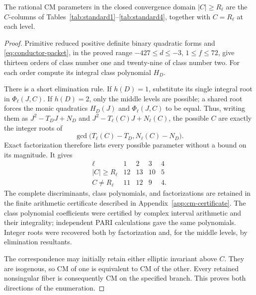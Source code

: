 \begin{lemma}
\label{lem:cm-finite-enumeration}
The rational CM parameters in the closed convergence domain
$|C|\ge R_\ell$ are the $C$-columns of
Tables~\ref{tab:standard1}--\ref{tab:standard4}, together with
$C=R_\ell$ at each level.
\end{lemma}
\begin{proof}
Primitive reduced positive definite binary quadratic forms and
\eqref{eq:conductor-packet}, in the proved range
$-427\le d\le-3$, $1\le f\le72$, give thirteen orders of class
number one and twenty-nine of class number two.  For each order
compute its integral class polynomial $H_D$.

There is a short elimination rule.  If $h(D)=1$, substitute its
single integral root in $\Phi_\ell(J,C)$.  If $h(D)=2$, only the
middle levels are possible; a shared root forces the monic
quadratics $H_D(J)$ and $\Phi_\ell(J,C)$ to be equal.  Thus, writing
them as $J^2-T_DJ+N_D$ and $J^2-T_\ell(C)J+N_\ell(C)$, the
possible $C$ are exactly the integer roots of
\[
               \gcd\bigl(T_\ell(C)-T_D,
                          N_\ell(C)-N_D\bigr).
\]
Exact factorization therefore lists every possible parameter
without a bound on its magnitude.  It gives
\[
\begin{array}{c|rrrr}
\ell&1&2&3&4\\\hline
|C|\ge R_\ell&12&13&10&5\\
C\ne R_\ell&11&12&9&4.
\end{array}
\]
The complete discriminants, class polynomials, and factorizations
are retained in the finite arithmetic certificate described in
Appendix~\ref{app:cm-certificate}.  The class
polynomial coefficients were certified by complex interval
arithmetic and their integrality; independent PARI calculations
gave the same polynomials.  Integer roots were recovered both by
factorization and, for the middle levels, by elimination resultants.

The correspondence may initially retain either elliptic invariant
above $C$.  They are isogenous, so CM of one is equivalent to CM of
the other.  Every retained nonsingular fiber is consequently CM on
the specified branch.  This proves both directions of the
enumeration.
\end{proof}

